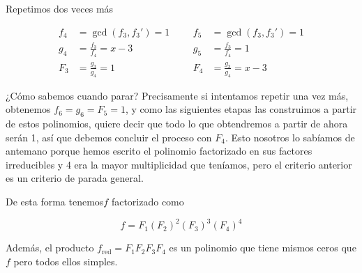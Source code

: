 \documentclass[./main.tex]{subfiles}
\begin{document}
Repetimos dos veces más

\begin{align*}
    f_4 &= \gcd(f_3, f_3') = 1 &&& f_5 &= \gcd(f_3, f_3') = 1\\
    g_4 &= \frac{f_3}{f_4} = x - 3&&&g_5 &= \frac{f_3}{f_4} = 1  \\
    F_3 &= \frac{g_3}{g_4} = 1&&&F_4 &= \frac{g_3}{g_4} = x-3
\end{align*}

¿Cómo sabemos cuando parar? Precisamente si intentamos repetir una vez más, obtenemos $f_6=g_6=F_5=1$, y como las siguientes etapas las construimos a partir de estos polinomios, quiere decir que todo lo que obtendremos a partir de ahora serán 1, así que debemos concluir el proceso con $F_4$. Esto nosotros lo sabíamos de antemano porque hemos escrito el polinomio factorizado en sus factores irreducibles y 4 era la mayor multiplicidad que teníamos, pero el criterio anterior es un criterio de parada general.

De esta forma tenemos$f$ factorizado como

\[ f= F_1(F_2)^2(F_3)^3(F_4)^4 \]

Además, el producto $f_{\operatorname{red}} = F_1F_2F_3F_4$ es un polinomio que tiene mismos ceros que $f$ pero todos ellos simples.
\end{document}
